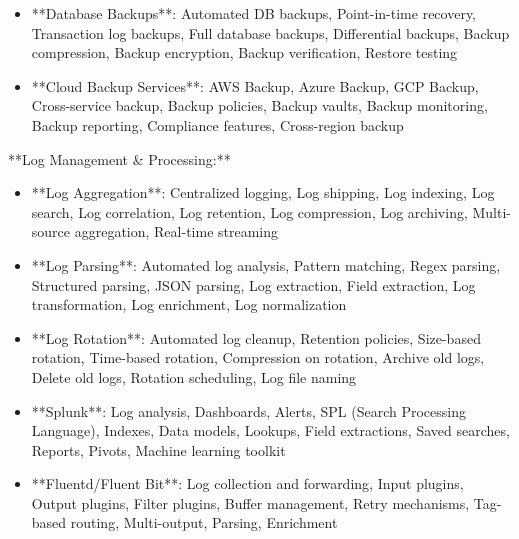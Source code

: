 \documentclass[11pt,a4paper]{article}
\begin{document}
\begin{itemize}
\item **Database Backups**: Automated DB backups, Point-in-time recovery, Transaction log backups, Full database backups, Differential backups, Backup compression, Backup encryption, Backup verification, Restore testing
\end{itemize}

\begin{itemize}
\item **Cloud Backup Services**: AWS Backup, Azure Backup, GCP Backup, Cross-service backup, Backup policies, Backup vaults, Backup monitoring, Backup reporting, Compliance features, Cross-region backup
\end{itemize}

**Log Management \& Processing:**

\begin{itemize}
\item **Log Aggregation**: Centralized logging, Log shipping, Log indexing, Log search, Log correlation, Log retention, Log compression, Log archiving, Multi-source aggregation, Real-time streaming
\end{itemize}

\begin{itemize}
\item **Log Parsing**: Automated log analysis, Pattern matching, Regex parsing, Structured parsing, JSON parsing, Log extraction, Field extraction, Log transformation, Log enrichment, Log normalization
\end{itemize}

\begin{itemize}
\item **Log Rotation**: Automated log cleanup, Retention policies, Size-based rotation, Time-based rotation, Compression on rotation, Archive old logs, Delete old logs, Rotation scheduling, Log file naming
\end{itemize}

\begin{itemize}
\item **Splunk**: Log analysis, Dashboards, Alerts, SPL (Search Processing Language), Indexes, Data models, Lookups, Field extractions, Saved searches, Reports, Pivots, Machine learning toolkit
\end{itemize}

\begin{itemize}
\item **Fluentd/Fluent Bit**: Log collection and forwarding, Input plugins, Output plugins, Filter plugins, Buffer management, Retry mechanisms, Tag-based routing, Multi-output, Parsing, Enrichment
\end{itemize}
\end{document}
